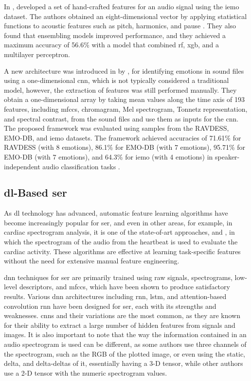 In \citeyear{HandCraftedSahu}, \citeauthor{HandCraftedSahu} developed a set of hand-crafted features for an audio signal using the \ac{iemo} dataset. The authors obtained an eight-dimensional vector by applying statistical functions to acoustic features such as pitch, harmonics, and pause \cite{HandCraftedSahu}. They also found that ensembling models improved performance, and they achieved a maximum accuracy of 56.6\% with a model that combined \ac{rf}, \ac{xgb}, and a multilayer perceptron.

A new architecture was introduced in \citeyear{Issa2020} by \citeauthor{Issa2020}, for identifying emotions in sound files using a one-dimensional \ac{cnn}, which is not typically considered a traditional model, however, the extraction of features was still performed manually. They obtain a one-dimensional array by taking mean values along the time axis of 193 features, including \ac{mfccs}, chromagram, Mel spectrogram, Tonnetz representation, and spectral contrast, from the sound files and use them as inputs for the \ac{cnn}. The proposed framework was evaluated using samples from the RAVDESS, EMO-DB, and \ac{iemo} datasets. The framework achieved accuracies of 71.61\% for RAVDESS (with 8 emotions), 86.1\% for EMO-DB (with 7 emotions), 95.71\% for EMO-DB (with 7 emotions), and 64.3\% for \ac{iemo} (with 4 emotions) in speaker-independent audio classification tasks \cite{Issa2020}.

\subsection{\acl{dl}-Based \ac{ser}}

As \ac{dl} technology has advanced, automatic feature learning algorithms have become increasingly popular for \ac{ser}, and even in other areas, for example, in cardiac spectrogram analysis, it is one of the state-of-art approaches, \cite{8759878} and \cite{Zhou2022}, in which the spectrogram of the audio from the heartbeat is used to evaluate the cardiac activity. These algorithms are effective at learning task-specific features without the need for extensive manual feature engineering.

\ac{dnn} techniques for \ac{ser} are primarily trained using raw signals, spectrograms, low-level descriptors, and \ac{mfccs}, which have been shown to produce satisfactory results. Various \ac{dnn} architectures including \ac{rnn}, \ac{lstm}, and attention-based convolution \ac{rnn} have been designed for \ac{ser}, each with its strengths and weaknesses. \acp{cnn} and their variations are the most common, as they are known for their ability to extract a large number of hidden features from signals and images. It is also important to note that the way the information contained in an audio spectrogram is used can be different, as some authors use three channels of the spectrogram, such as the RGB of the plotted image, or even using the static, delta, and delta-deltas of it, essentially having a 3-D tensor, while other authors use a 2-D tensor with the numeric spectrogram values.

